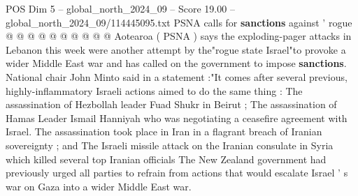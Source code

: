 \begin{textsample}{POS Dim 5 – global\_north\_2024\_09 – Score 19.00 – global\_north\_2024\_09/114445095.txt}
PSNA calls for \textbf{sanctions} against ' rogue @ @ @ @ @ @ @ @ @ @ Aotearoa ( PSNA ) says the exploding-pager attacks in Lebanon this week were another attempt by the"rogue state Israel"to provoke a wider Middle East war and has called on the government to impose \textbf{sanctions}.
National chair John Minto said in a statement :"It comes after several previous, highly-inflammatory Israeli actions aimed to do the same thing : The assassination of Hezbollah leader Fuad Shukr in Beirut ; The assassination of Hamas Leader Ismail Hanniyah who was negotiating a ceasefire agreement with Israel.
The assassination took place in Iran in a flagrant breach of Iranian sovereignty ; and The Israeli missile attack on the Iranian consulate in Syria which killed several top Iranian officials The New Zealand government had previously urged all parties to refrain from actions that would escalate Israel ' s war on Gaza into a wider Middle East war.

\end{textsample}
